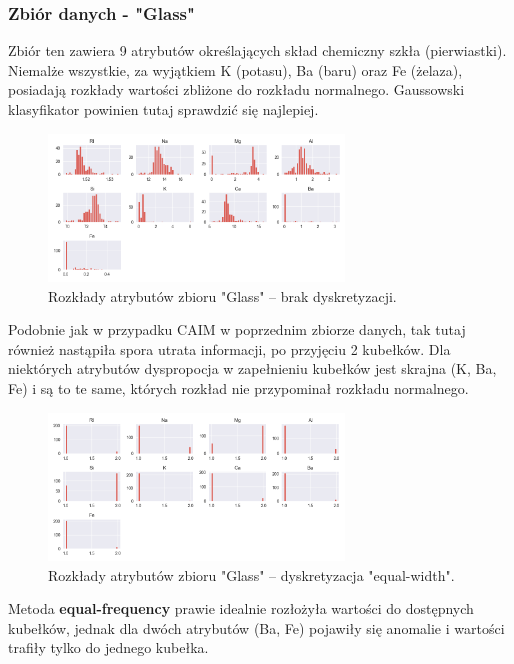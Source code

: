 \pagebreak
\subsubsection{Zbiór danych - "Glass"}
    Zbiór ten zawiera 9 atrybutów określających skład chemiczny szkła (pierwiastki).
    Niemalże wszystkie, za wyjątkiem K (potasu), Ba (baru) oraz Fe (żelaza), posiadają
    rozkłady wartości zbliżone do rozkładu normalnego. Gaussowski klasyfikator powinien
    tutaj sprawdzić się najlepiej.

    \begin{figure}[H]
        \center
        \includegraphics[width=0.7\textwidth]{img/discretization/non_discretized_glass.png}
        \caption{Rozkłady atrybutów zbioru "Glass" -- brak dyskretyzacji.}
    \end{figure}

    Podobnie jak w przypadku CAIM w poprzednim zbiorze danych, tak tutaj również nastąpiła
    spora utrata informacji, po przyjęciu 2 kubełków. Dla niektórych atrybutów dyspropocja
    w zapełnieniu kubełków jest skrajna (K, Ba, Fe) i są to te same, których rozkład nie
    przypominał rozkładu normalnego.

    \begin{figure}[H]
        \center
        \includegraphics[width=0.7\textwidth]{img/discretization/ew_glass.png}
        \caption{Rozkłady atrybutów zbioru "Glass" -- dyskretyzacja "equal-width".}
    \end{figure}

    \pagebreak
    Metoda \textbf{equal-frequency} prawie idealnie rozłożyła wartości do dostępnych
    kubełków, jednak dla dwóch atrybutów (Ba, Fe) pojawiły się anomalie i wartości
    trafiły tylko do jednego kubełka.

